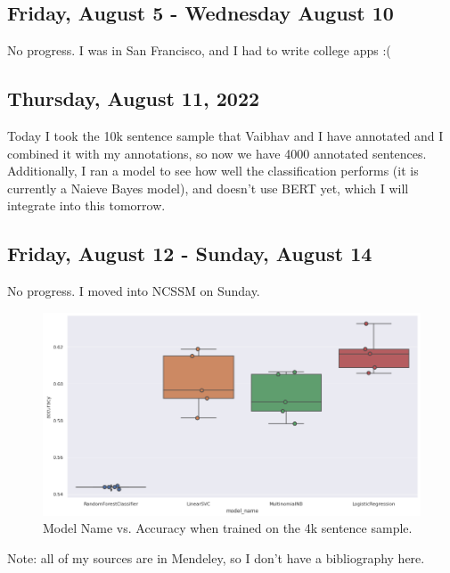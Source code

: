 \documentclass[11pt,letterpaper]{article}
\begin{document}
\subsection{Friday, August 5 - Wednesday August 10}
No progress. I was in San Francisco, and I had to write college apps :(

\subsection{Thursday, August 11, 2022}
Today I took the 10k sentence sample that Vaibhav and I have annotated and I combined it with my annotations, so now we have 4000 annotated sentences. Additionally, I ran a model to see how well the classification performs (it is currently a Naieve Bayes model), and doesn't use BERT yet, which I will integrate into this tomorrow.


\subsection{Friday, August 12 - Sunday, August 14}
No progress. I moved into NCSSM on Sunday.




\begin{figure}
    \centering
    \includegraphics[scale=0.4]{images/accuracies.png}
    \caption{Model Name vs. Accuracy when trained on the 4k sentence sample.}
    \label{fig:acc_4k_sample}
\end{figure}







\newpage
Note: all of my sources are in Mendeley, so I don't have a bibliography here.
\end{document}
